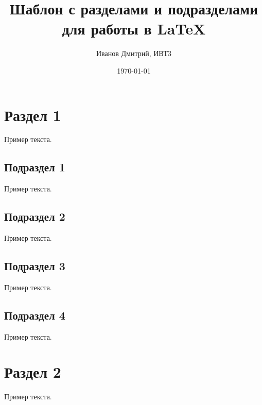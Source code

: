 \documentclass[a4paper,12pt]{article} %
\author{Иванов Дмитрий, ИВТ3}
\title{Шаблон с разделами и подразделами для работы в \LaTeX{}}
\date{\today}
\begin{document}

\maketitle
\newpage

\section{Раздел 1}
Пример текста.
\subsection{Подраздел 1}
Пример текста.
\subsection{Подраздел 2}
Пример текста.
\subsection{Подраздел 3}
Пример текста.
\subsection{Подраздел 4}
Пример текста.
\section{Раздел 2}
Пример текста.
\end{document}

